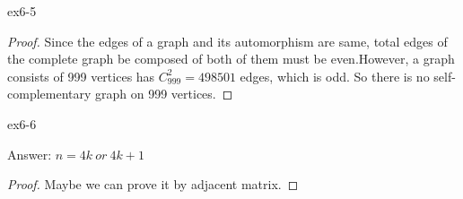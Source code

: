 \begin{exercise}
ex6-5
\end{exercise}

\begin{proof}
Since the edges of a graph and its automorphism are same, total edges of the complete graph be composed of both of them must be even.However, a graph consists of 999 vertices has $C_{999}^2=498501$ edges, which is odd. So there is no self-complementary graph on 999 vertices.
\end{proof}

\begin{exercise}
ex6-6
\end{exercise}

Answer: $n=4k\: or\: 4k+1$
\begin{proof}
Maybe we can prove it by adjacent matrix.
\end{proof}